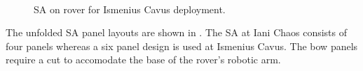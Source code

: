 \begin{figure}[h]
\begin{subfigure}[t]{\subfigureWidth}
		\label{fig:sub:solar-array-on-rover-for-ismenius-cavus-deployed}
	\end{subfigure}\\[0.8ex]
    \caption[Solar array on rover for Ismenius Cavus deployment]
            {\ac{SA} on rover for Ismenius Cavus deployment.}
    \label{fig:solar-array-on-ismenius-cavus-chaos}
\vspace{-2ex}
\end{figure}

\clearpage
The unfolded \ac{SA} panel layouts are shown in . The \ac{SA} at Iani Chaos consists of four panels whereas a six panel design is used at Ismenius Cavus. The bow panels require a cut to accomodate the base of the rover's robotic arm.

\vspace{0.5cm}

